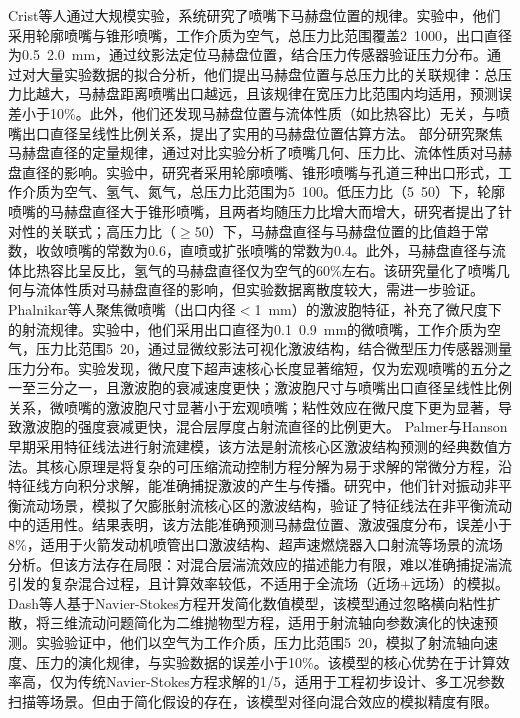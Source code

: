 Crist等人通过大规模实验\supercite{crist1966study}，系统研究了喷嘴下马赫盘位置的规律。实验中，他们采用轮廓喷嘴与锥形喷嘴，工作介质为空气，总压力比范围覆盖2~1000，出口直径为0.5~2.0~mm，通过纹影法定位马赫盘位置，结合压力传感器验证压力分布。通过对大量实验数据的拟合分析，他们提出马赫盘位置与总压力比的关联规律：总压力比越大，马赫盘距离喷嘴出口越远，且该规律在宽压力比范围内均适用，预测误差小于10\%。此外，他们还发现马赫盘位置与流体性质（如比热容比）无关，与喷嘴出口直径呈线性比例关系，提出了实用的马赫盘位置估算方法。
部分研究聚焦马赫盘直径的定量规律\supercite{addy1981effects,murugesan2020numerical}，通过对比实验分析了喷嘴几何、压力比、流体性质对马赫盘直径的影响。实验中，研究者采用轮廓喷嘴、锥形喷嘴与孔道三种出口形式，工作介质为空气、氢气、氮气，总压力比范围为5~100。低压力比（5~50）下，轮廓喷嘴的马赫盘直径大于锥形喷嘴，且两者均随压力比增大而增大，研究者提出了针对性的关联式；高压力比（$\ge$50）下，马赫盘直径与马赫盘位置的比值趋于常数，收敛喷嘴的常数为0.6，直喷或扩张喷嘴的常数为0.4。此外，马赫盘直径与流体比热容比呈反比，氢气的马赫盘直径仅为空气的60\%左右。该研究量化了喷嘴几何与流体性质对马赫盘直径的影响，但实验数据离散度较大，需进一步验证。
Phalnikar等人聚焦微喷嘴（出口内径$<$1~mm）的激波胞特征，补充了微尺度下的射流规律\supercite{phalnikar2008experiments}。实验中，他们采用出口直径为0.1~0.9~mm的微喷嘴，工作介质为空气，压力比范围5~20，通过显微纹影法可视化激波结构，结合微型压力传感器测量压力分布。实验发现，微尺度下超声速核心长度显著缩短，仅为宏观喷嘴的五分之一至三分之一，且激波胞的衰减速度更快；激波胞尺寸与喷嘴出口直径呈线性比例关系，微喷嘴的激波胞尺寸显著小于宏观喷嘴；粘性效应在微尺度下更为显著，导致激波胞的强度衰减更快，混合层厚度占射流直径的比例更大。
Palmer与Hanson早期采用特征线法进行射流建模\supercite{phalnikar2008experiments}，该方法是射流核心区激波结构预测的经典数值方法。其核心原理是将复杂的可压缩流动控制方程分解为易于求解的常微分方程，沿特征线方向积分求解，能准确捕捉激波的产生与传播。研究中，他们针对振动非平衡流动场景，模拟了欠膨胀射流核心区的激波结构，验证了特征线法在非平衡流动中的适用性。结果表明，该方法能准确预测马赫盘位置、激波强度分布，误差小于8\%，适用于火箭发动机喷管出口激波结构、超声速燃烧器入口射流等场景的流场分析。但该方法存在局限：对混合层湍流效应的描述能力有限，难以准确捕捉湍流引发的复杂混合过程，且计算效率较低，不适用于全流场（近场+远场）的模拟。
Dash等人基于Navier-Stokes方程开发简化数值模型\supercite{dash1978analysis}，该模型通过忽略横向粘性扩散，将三维流动问题简化为二维抛物型方程，适用于射流轴向参数演化的快速预测。实验验证中，他们以空气为工作介质，压力比范围5~20，模拟了射流轴向速度、压力的演化规律，与实验数据的误差小于10\%。该模型的核心优势在于计算效率高，仅为传统Navier-Stokes方程求解的1/5，适用于工程初步设计、多工况参数扫描等场景。但由于简化假设的存在，该模型对径向混合效应的模拟精度有限。
